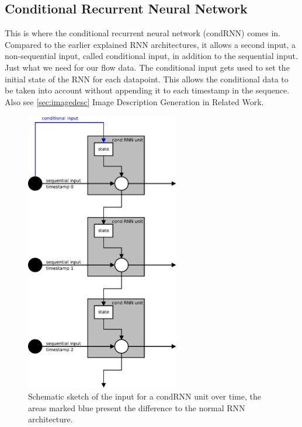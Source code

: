 \documentclass[
	ngerman,
	ruledheaders=section,%
	class=report,%
	thesis={type=bachelor},%
	accentcolor=9c,%
	custommargins=true,%
	marginpar=false,%
	parskip=half-,%
	fontsize=11pt,%
]{tudapub}
\begin{document}

\subsection{Conditional Recurrent Neural Network}
\label{sec:condRNN}

This is where the conditional recurrent neural network (condRNN) \cite{remyPhilipperemyCondRnn2020} comes in.
Compared to the earlier explained RNN architectures, it allows a second input, a non-sequential input, called conditional input, in addition to the sequential input.
Just what we need for our flow data.
The conditional input gets used to set the initial state of the RNN for each datapoint.
This allows the conditional data to be taken into account without appending it to each timestamp in the sequence.
Also see \ref{sec:imagedesc} Image Description Generation in Related Work.

\begin{figure}
    \includegraphics[width=0.6\textwidth]{condRNN.pdf}
    \caption{Schematic sketch of the input for a condRNN unit over time, the areas marked blue present the difference to the normal RNN architecture.}
    \label{fig:condRNN}
\end{figure}
\end{document}
